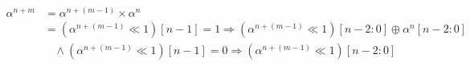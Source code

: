         \begin{equation*}
            \begin{split}
                \alpha^{n+m} & =\alpha^{n+(m-1)}\times \alpha^{n} \\
                & = (\alpha^{n+(m-1)} \ll 1 )[n-1] = 1 \Longrightarrow
                (\alpha^{n+(m-1)} \ll 1 )[n-2:0] \oplus \alpha^{n}[n-2:0] \\
                & \ \ \ \ \wedge (\alpha^{n+(m-1)} \ll 1 )[n-1] = 0
                \Longrightarrow ( \alpha^{n+(m-1)} \ll 1 )[n-2:0] \\
            \end{split}
        \end{equation*}

    \newpage

